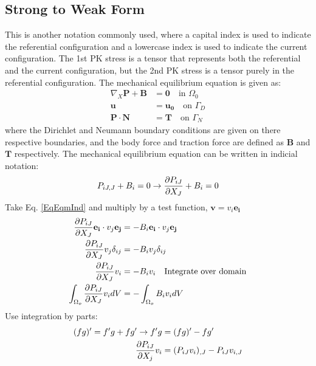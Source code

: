 \documentclass[12pt,3p]{article}
\begin{document}
\subsection{Strong to Weak Form}
\vspace{-1ex}
This is another notation commonly used, where a capital index is used to indicate the referential configuration and a lowercase index is used to indicate the current configuration. The 1st PK stress is a tensor that represents both the referential and the current configuration, but the 2nd PK stress is a tensor purely in the referential configuration. The mechanical equilibrium equation is given as: 
\begin{subequations}\label{EqEqm}
\begin{align}
\nabla_X \mathbf{P} + \mathbf{B} &= \mathbf{0} \quad \text{in } \Omega_0 \\
\mathbf{u} &= \mathbf{u_0} \quad \text{on } \Gamma_D \\
\mathbf{P} \cdot \mathbf{N} &= \mathbf{T} \quad \text{on } \Gamma_N 
\end{align}
\end{subequations}
where the Dirichlet and Neumann boundary conditions are given on there respective boundaries, and the body force and traction force are defined as $\mathbf{B}$ and $\mathbf{T}$ respectively. The mechanical equilibrium equation can be written in indicial notation: 
\begin{equation}\label{EqEqmInd}
P_{iJ,J} + B_i = 0 \rightarrow \pdv{P_{iJ}}{X_J} + B_i = 0 
\end{equation}
Take Eq. \ref{EqEqmInd} and multiply by a test function, $\mathbf{v} = v_i \mathbf{e_i}$
\begin{align}\label{EqBefInt}
\begin{split}
\pdv{P_{iJ}}{X_J} \mathbf{e_i} \cdot v_j \mathbf{e_j} &= - B_i \mathbf{e_i} \cdot v_j \mathbf{e_j} \\
\pdv{P_{iJ}}{X_J} v_j \delta_{ij} &= - B_i v_j \delta_{ij} \\
\pdv{P_{iJ}}{X_J} v_i &= - B_i v_i \quad \text{Integrate over domain} \\
\int_{\Omega_o} \pdv{P_{iJ}}{X_J} v_i dV &= - \int_{\Omega_o} B_i v_i dV
\end{split}
\end{align}
Use integration by parts: 
\begin{align*}
(fg)' = f'g + f g' \rightarrow f'g &= (fg)' - f g' \\
			\pdv{P_{iJ}}{X_j} v_i &= (P_{iJ} v_i)_{,J} - P_{iJ} v_{i,J}
\end{align*}
\end{document}
